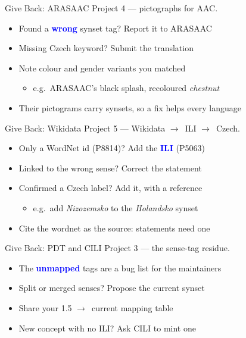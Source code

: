 \documentclass[xetex,aspectratio=169]{beamer}
\newcommand{\txx}[1]{\textbf{\textcolor{blue}{#1}}}
\newcommand{\into}{\ensuremath{\rightarrow}\xspace}
\begin{document}
\begin{frame}{Give Back: ARASAAC}
  Project 4 --- pictographs for AAC.
  \begin{itemize}
  \item Found a \txx{wrong} synset tag? Report it to ARASAAC
  \item Missing Czech keyword? Submit the translation
  \item Note colour and gender variants you matched
    \begin{itemize}
    \item e.g.\ ARASAAC's black splash, recoloured \textit{chestnut}
    \end{itemize}
  \item Their pictograms carry synsets, so a fix helps every language
  \end{itemize}
\end{frame}

\begin{frame}{Give Back: Wikidata}
  Project 5 --- Wikidata \into\ ILI \into\ Czech.
  \begin{itemize}
  \item Only a WordNet id (P8814)? Add the \txx{ILI} (P5063)
  \item Linked to the wrong sense? Correct the statement
  \item Confirmed a Czech label? Add it, with a reference
    \begin{itemize}
    \item e.g.\ add \textit{Nizozemsko} to the \textit{Holandsko} synset
    \end{itemize}
  \item Cite the wordnet as the source: statements need one
  \end{itemize}
\end{frame}

\begin{frame}{Give Back: PDT and CILI}
  Project 3 --- the sense-tag residue.
  \begin{itemize}
  \item The \txx{unmapped} tags are a bug list for the maintainers
  \item Split or merged senses? Propose the current synset
  \item Share your 1.5 \into\ current mapping table
  \item New concept with no ILI? Ask CILI to mint one
  \end{itemize}
\end{frame}
\end{document}
